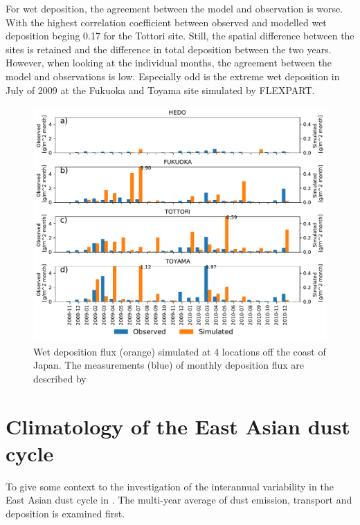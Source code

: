 For wet deposition, the agreement between the model and observation is worse. 
With the highest correlation coefficient between observed and modelled wet deposition  beging 0.17 for the Tottori site.  
Still, the spatial difference between the sites is retained and the difference in total deposition between the two years. 
However, when looking at the individual months, the agreement between the model and observations is low. 
Especially odd is the extreme wet deposition in July of 2009 at the Fukuoka and Toyama site simulated by FLEXPART. 

\begin{figure}[hptb]
    \centering
    \includegraphics[width=\textwidth]{texfiles/figs/monthly_accumulated_wet_depostion_japan.pdf}
    \caption{Wet deposition flux (orange) simulated at 4 locations off the coast of Japan. The measurements (blue) of monthly deposition flux are described by \textcite{osada2014wet}}
    \label{fig:model_eval_wet_deposition}
\end{figure}

\section{Climatology of the East Asian dust cycle}\label{sec:result_average}
To give some context to the investigation of the interannual variability in the East Asian dust cycle in . The multi-year average of dust emission, transport and deposition is examined first. 
